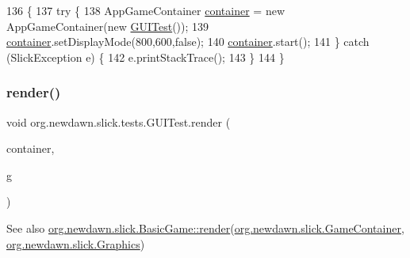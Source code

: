 \begin{DoxyCode}
136                                            \{
137         \textcolor{keywordflow}{try} \{
138             AppGameContainer \mbox{\hyperlink{classorg_1_1newdawn_1_1slick_1_1tests_1_1_g_u_i_test_a71a14c16d92d7fbb77511e4fc241e8b9}{container}} = \textcolor{keyword}{new} AppGameContainer(\textcolor{keyword}{new} 
      \mbox{\hyperlink{classorg_1_1newdawn_1_1slick_1_1tests_1_1_g_u_i_test_ad2755f50617bf163c40a8db03d7bfe56}{GUITest}}());
139             \mbox{\hyperlink{classorg_1_1newdawn_1_1slick_1_1tests_1_1_g_u_i_test_a71a14c16d92d7fbb77511e4fc241e8b9}{container}}.setDisplayMode(800,600,\textcolor{keyword}{false});
140             \mbox{\hyperlink{classorg_1_1newdawn_1_1slick_1_1tests_1_1_g_u_i_test_a71a14c16d92d7fbb77511e4fc241e8b9}{container}}.start();
141         \} \textcolor{keywordflow}{catch} (SlickException e) \{
142             e.printStackTrace();
143         \}
144     \}
\end{DoxyCode}
\mbox{\label{classorg_1_1newdawn_1_1slick_1_1tests_1_1_g_u_i_test_a0445cdc0c48a9345c36b255fa2b91e08}} 
\subsubsection{\texorpdfstring{render()}{render()}}
{\footnotesize\ttfamily void org.\+newdawn.\+slick.\+tests.\+G\+U\+I\+Test.\+render (\begin{DoxyParamCaption}\item[{\mbox{\hyperlink{classorg_1_1newdawn_1_1slick_1_1_game_container}{Game\+Container}}}]{container,  }\item[{\mbox{\hyperlink{classorg_1_1newdawn_1_1slick_1_1_graphics}{Graphics}}}]{g }\end{DoxyParamCaption})\hspace{0.3cm}{\ttfamily [inline]}}

\begin{DoxySeeAlso}{See also}
\mbox{\hyperlink{interfaceorg_1_1newdawn_1_1slick_1_1_game_af1a4670d43eb3ba04dfcf55ab1975b64}{org.\+newdawn.\+slick.\+Basic\+Game\+::render}}(\mbox{\hyperlink{classorg_1_1newdawn_1_1slick_1_1_game_container}{org.\+newdawn.\+slick.\+Game\+Container}}, \mbox{\hyperlink{classorg_1_1newdawn_1_1slick_1_1_graphics}{org.\+newdawn.\+slick.\+Graphics}}) 
\end{DoxySeeAlso}


